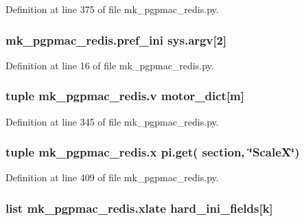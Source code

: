 Definition at line 375 of file mk\-\_\-pgpmac\-\_\-redis.\-py.

\hypertarget{namespacemk__pgpmac__redis_a38c785af5201403976e1267c47ea5096}{
\subsubsection[{pref\-\_\-ini}]{\setlength{\rightskip}{0pt plus 5cm}mk\-\_\-pgpmac\-\_\-redis.\-pref\-\_\-ini sys.\-argv\mbox{[}2\mbox{]}}}\label{namespacemk__pgpmac__redis_a38c785af5201403976e1267c47ea5096}


Definition at line 16 of file mk\-\_\-pgpmac\-\_\-redis.\-py.

\hypertarget{namespacemk__pgpmac__redis_ac732d49b0afca9a9951e3a252bae42fc}{
\subsubsection[{v}]{\setlength{\rightskip}{0pt plus 5cm}tuple mk\-\_\-pgpmac\-\_\-redis.\-v {\bf motor\-\_\-dict}\mbox{[}m\mbox{]}}}\label{namespacemk__pgpmac__redis_ac732d49b0afca9a9951e3a252bae42fc}


Definition at line 345 of file mk\-\_\-pgpmac\-\_\-redis.\-py.

\hypertarget{namespacemk__pgpmac__redis_abc8696f6f2f3fd3edd30989d3c8ec301}{
\subsubsection[{x}]{\setlength{\rightskip}{0pt plus 5cm}tuple mk\-\_\-pgpmac\-\_\-redis.\-x pi.\-get( section, \char`\"{}Scale\-X\char`\"{})}}\label{namespacemk__pgpmac__redis_abc8696f6f2f3fd3edd30989d3c8ec301}


Definition at line 409 of file mk\-\_\-pgpmac\-\_\-redis.\-py.

\hypertarget{namespacemk__pgpmac__redis_afba647feb8fc4d0a364c3dca29af3a22}{
\subsubsection[{xlate}]{\setlength{\rightskip}{0pt plus 5cm}list mk\-\_\-pgpmac\-\_\-redis.\-xlate {\bf hard\-\_\-ini\-\_\-fields}\mbox{[}k\mbox{]}}}\label{namespacemk__pgpmac__redis_afba647feb8fc4d0a364c3dca29af3a22}


